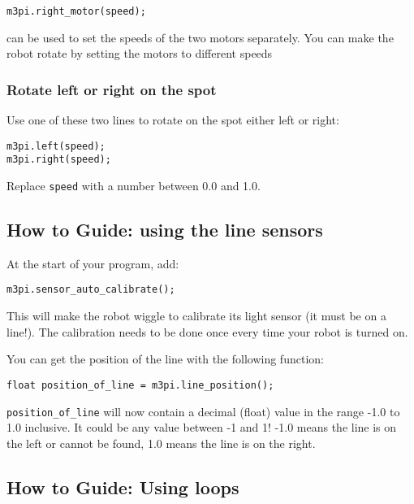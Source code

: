 \begin{lstlisting}
m3pi.right_motor(speed);
\end{lstlisting}

can be used to set the speeds of the two motors separately. You can make
the robot rotate by setting the motors to different speeds

\subsubsection{Rotate left or right on the
spot}\label{rotate-left-or-right-on-the-spot}

Use one of these two lines to rotate on the spot either left or right:

\begin{lstlisting}
m3pi.left(speed);
m3pi.right(speed);
\end{lstlisting}

Replace \lstinline!speed! with a number between 0.0 and 1.0.

\subsection{How to Guide: using the line
sensors}\label{how-to-guide-using-the-line-sensors}

At the start of your program, add:

\begin{lstlisting}
m3pi.sensor_auto_calibrate();
\end{lstlisting}

This will make the robot wiggle to calibrate its light sensor (it must
be on a line!). The calibration needs to be done once every time your
robot is turned on.

You can get the position of the line with the following function:

\begin{lstlisting}
float position_of_line = m3pi.line_position();
\end{lstlisting}

\lstinline!position_of_line! will now contain a decimal (float) value in
the range -1.0 to 1.0 inclusive. It could be any value between -1 and 1!
-1.0 means the line is on the left or cannot be found, 1.0 means the
line is on the right.

\subsection{How to Guide: Using loops}\label{how-to-guide-using-loops}

